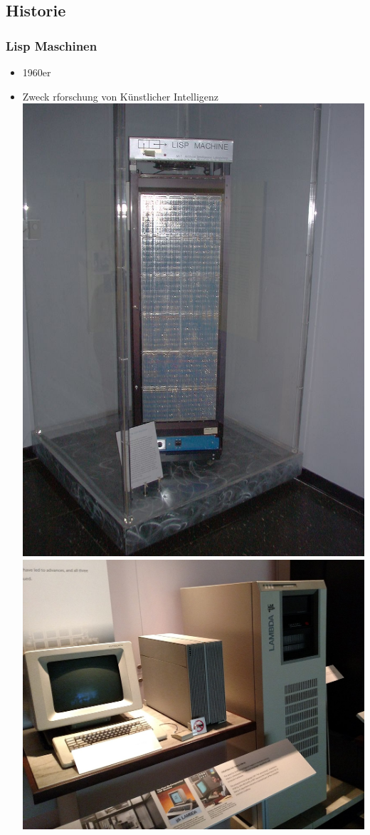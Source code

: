 \documentclass{beamer}
\begin{document}
\begin{frame}
	\section{Historie}
\frametitle{Lisp Maschinen}
	\begin{itemize}
            \item 1960er
            \item Zweck rforschung von Künstlicher Intelligenz
            \includegraphics[scale=0.1]{bilder/lispm.jpg}
            \includegraphics[scale=0.1]{bilder/lispm1.jpg}

\end{itemize}
\end{frame}
\end{document}
